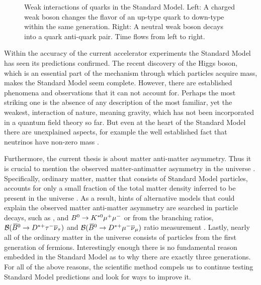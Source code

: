 \begin{figure}[t]
  \centering
  \begin{subfigure}{0.49\textwidth}
    \hspace{1.3cm}
    \scalebox{1.}{}
    \caption{}
    \label{CC_WeakInteractions}
  \end{subfigure}%
  \hfill%
  \begin{subfigure}{0.49\textwidth}
    \hspace{1.3cm}
    \scalebox{1.}{}
    \caption{}
    \label{NC_WeakInteractions}
  \end{subfigure}
  \caption{Weak interactions of quarks in the Standard Model. Left: A charged weak boson changes the flavor
           of an up-type quark to down-type within the same generation.
           Right: A neutral weak boson decays into a quark anti-quark pair. Time flows from left to right.}
\label{WeakInteractions}
\end{figure}

Within the accuracy of the current accelerator experiments the Standard Model has seen its predictions confirmed.
The recent discovery of the Higgs boson, which is an essential part of the mechanism through which particles acquire mass,
makes the Standard Model seem complete. However, there are established phenomena and observations that it can not
account for. Perhaps the most striking one is the absence of any description of the most familiar, yet the weakest,
interaction of nature, meaning gravity, which has not been incorporated in a quantum field theory so far.
But even at the heart of the Standard Model there are unexplained aspects, for example the well established
fact that neutrinos have non-zero mass \cite{nu-mass-superkam,nu-mass-kamland,nu-mass-sno,nu-mass-daya}.

Furthermore, the current thesis is about matter anti-matter asymmetry. Thus it is crucial to mention
the observed matter-antimatter asymmetry in the universe \cite{more-cpv-huet,more-cpv-gavela_I,more-cpv-gavela_II}.
Specifically, ordinary matter, \ie matter that consists of Standard Model particles, accounts for only a small
fraction of the total matter density inferred to be present in the universe \cite{dmatter-Hinshaw}.
As a result, hints of alternative models that could explain the observed matter anti-matter asymmetry are
searched in particle decays, such as \Bsmm, \Bdmm \cite{CMS:2014xfa} and $B^0 \rightarrow K^{*0} \mu^+\mu^-$\cite{Aaij:2015oid}
or from the branching ratios, ${\cal B}(\kern 0.18em\overline{\kern -0.18em B}{}^0 \rightarrow D^{*+} \tau^-\overline{\nu}_\tau)$ and ${\cal B}(\kern 0.18em\overline{\kern -0.18em B}{}^0 \rightarrow D^{*+} \mu^-\overline{\nu}_\mu)$ ratio measurement \cite{Aaij:2015yra}.
Lastly, nearly all of the ordinary matter in the universe consists of particles from the first generation
of fermions. Interestingly enough there is no fundamental reason embedded in the Standard Model
as to why there are exactly three generations. For all of the above reasons, the scientific method compels
us to continue testing Standard Model predictions and look for ways to improve it.
